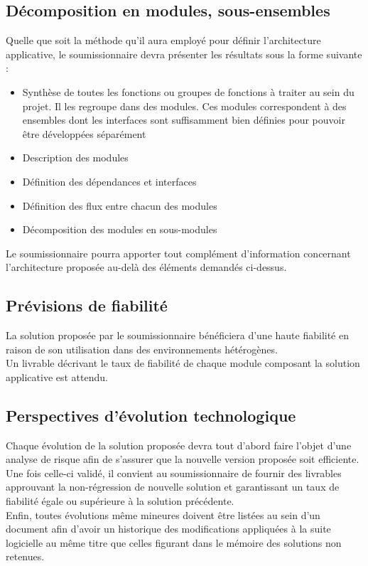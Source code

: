 \subsection{Décomposition en modules, sous-ensembles}
Quelle que soit la méthode qu'il aura employé pour définir l'architecture applicative, le soumissionnaire devra présenter les résultats sous la forme suivante :
\begin{itemize}[label=\textbullet]
 \item Synthèse de toutes les fonctions ou groupes de fonctions à traiter au sein du projet. Il les regroupe dans des modules. Ces modules correspondent à des ensembles dont les interfaces sont suffisamment bien définies pour pouvoir être développées séparément
 \item Description des modules
 \item Définition des dépendances et interfaces
 \item Définition des flux entre chacun des modules
 \item Décomposition des modules en sous-modules
\end{itemize}
Le soumissionnaire pourra apporter tout complément d'information concernant l'architecture proposée au-delà des éléments demandés ci-dessus. 

\subsection{Prévisions de fiabilité}
La solution proposée par le soumissionnaire bénéficiera d'une haute fiabilité en raison de son utilisation dans des environnements hétérogènes.
\\
Un livrable décrivant le taux de fiabilité de chaque module composant la solution applicative est attendu.

\subsection{Perspectives d'évolution technologique}
Chaque évolution de la solution proposée devra tout d'abord faire l'objet d'une analyse de risque afin de s'assurer que la nouvelle version proposée soit efficiente.
\\
Une fois celle-ci validé, il convient au soumissionnaire de fournir des livrables approuvant la non-régression de nouvelle solution et garantissant un taux de fiabilité égale ou supérieure à la solution précédente.
\\
Enfin, toutes évolutions même mineures doivent être listées au sein d'un document afin d'avoir un historique des modifications appliquées à la suite logicielle au même titre que celles figurant dans le mémoire des solutions non retenues.

